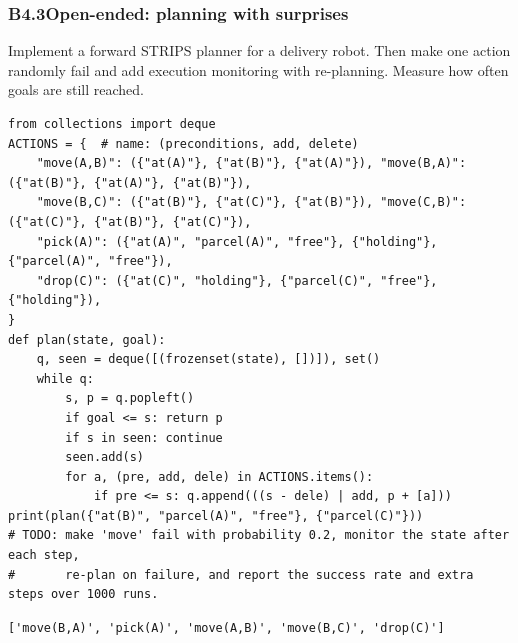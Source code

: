 \documentclass[11pt]{article}
\begin{document}
\subsubsection*{B4.3\quad Open-ended: planning with surprises}
Implement a forward STRIPS planner for a delivery robot. Then make one action randomly fail and add execution monitoring with re-planning. Measure how often goals are still reached.
\begin{lstlisting}[style=py]
from collections import deque
ACTIONS = {  # name: (preconditions, add, delete)
    "move(A,B)": ({"at(A)"}, {"at(B)"}, {"at(A)"}), "move(B,A)": ({"at(B)"}, {"at(A)"}, {"at(B)"}),
    "move(B,C)": ({"at(B)"}, {"at(C)"}, {"at(B)"}), "move(C,B)": ({"at(C)"}, {"at(B)"}, {"at(C)"}),
    "pick(A)": ({"at(A)", "parcel(A)", "free"}, {"holding"}, {"parcel(A)", "free"}),
    "drop(C)": ({"at(C)", "holding"}, {"parcel(C)", "free"}, {"holding"}),
}
def plan(state, goal):
    q, seen = deque([(frozenset(state), [])]), set()
    while q:
        s, p = q.popleft()
        if goal <= s: return p
        if s in seen: continue
        seen.add(s)
        for a, (pre, add, dele) in ACTIONS.items():
            if pre <= s: q.append(((s - dele) | add, p + [a]))
print(plan({"at(B)", "parcel(A)", "free"}, {"parcel(C)"}))
# TODO: make 'move' fail with probability 0.2, monitor the state after each step,
#       re-plan on failure, and report the success rate and extra steps over 1000 runs.
\end{lstlisting}
\begin{lstlisting}[style=out]
['move(B,A)', 'pick(A)', 'move(A,B)', 'move(B,C)', 'drop(C)']
\end{lstlisting}
\newpage
{}
\end{document}
